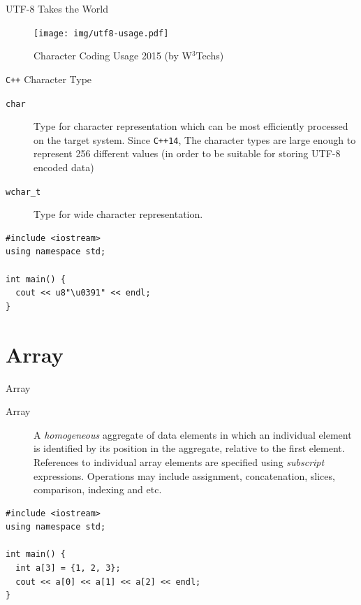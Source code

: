 \documentclass[presentation]{beamer}
\begin{document}
\begin{frame}[label={sec:orgheadline14}]{UTF-8 Takes the World}
\begin{figure}[htb]
\centering
\texttt{[image: img/utf8-usage.pdf]}
\caption{Character Coding Usage 2015 (by W\(^{\text{3}}\)Techs)}
\end{figure}
\end{frame}

\begin{frame}[fragile,label={sec:orgheadline15}]{\texttt{C++} Character Type}
 \begin{description}
\item[{\texttt{char}}] Type for character representation which can be most
efficiently processed on the target system.  Since \texttt{C++14},
The character types are large enough to represent 256
different values (in order to be suitable for storing UTF-8
encoded data)
\item[{\texttt{wchar\_t}}] Type for wide character representation.
\end{description}


\begin{verbatim}
#include <iostream>
using namespace std;

int main() {
  cout << u8"\u0391" << endl;
}
\end{verbatim}
\end{frame}

\section{Array}
\label{sec:orgheadline35}

\begin{frame}[fragile,label={sec:orgheadline17}]{Array}
 \begin{description}
\item[{Array}] A \emph{homogeneous} aggregate of data elements in which an
individual element is identified by its position in the
aggregate, relative to the first element.  References to
individual array elements are specified using \emph{subscript}
expressions.  Operations may include assignment,
concatenation, slices, comparison, indexing and etc.
\end{description}


\begin{verbatim}
#include <iostream>
using namespace std;

int main() {
  int a[3] = {1, 2, 3};
  cout << a[0] << a[1] << a[2] << endl;
}
\end{verbatim}
\end{frame}
\end{document}
